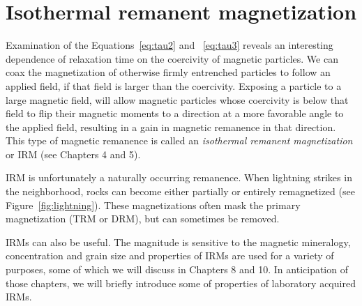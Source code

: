  
\section {Isothermal remanent magnetization}
\label{sect:irm}

 Examination of the Equations~\ref{eq:tau2} and ~\ref{eq:tau3}  reveals an interesting dependence of relaxation time on the coercivity  of magnetic particles.  We can coax the magnetization of otherwise  firmly entrenched particles to follow an applied field, if that field is larger than the coercivity.  Exposing a particle to a large magnetic field, will allow magnetic particles whose coercivity is below that field to flip their magnetic moments to a direction at a more favorable angle to the applied field, resulting in a gain in magnetic remanence in that direction. This type of magnetic remanence is called an
  {\it isothermal remanent magnetization} or IRM (see Chapters 4 and 5). 
  
 IRM is unfortunately a naturally occurring remanence.  When 
 lightning strikes in the neighborhood,  rocks can  become either partially or entirely remagnetized (see Figure~\ref{fig:lightning}).    These magnetizations often mask the primary magnetization (TRM or DRM), but can sometimes be removed.   
 
 IRMs can also be useful.  The magnitude is sensitive to the magnetic mineralogy, concentration and grain size and properties of IRMs are used for a variety of purposes, some of which we will discuss in Chapters 8 and 10.  
In anticipation of those chapters, we will briefly introduce some of properties of laboratory acquired IRMs.


